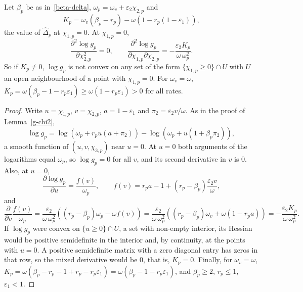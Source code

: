 \begin{proposition}\label{not-joint}
Let $\beta_p$ be as in~\eqref{beta-delta}, $\omega_p=\omega_v+\varepsilon_2\chi_{2,p}$ and
\begin{equation*}
K_p=\omega_v\left(\beta_p-r_p\right)-\omega\left(1-r_p(1-\varepsilon_1)\right),
\end{equation*}
the value of $\widehat\Delta_p$ at $\chi_{1,p}=0$. At $\chi_{1,p}=0$,
\begin{equation*}
\frac{\partial^2\log g_p}{\partial\chi_{2,p}^2}=0,\qquad
\frac{\partial^2\log g_p}{\partial\chi_{1,p}\partial\chi_{2,p}}=-\frac{\varepsilon_2K_p}{\omega\,\omega_p^2}.
\end{equation*}
So if $K_p\ne 0$, $\log g_p$ is not convex on any set of the form
$\{\chi_{1,p}\ge 0\}\cap U$ with $U$ an open neighbourhood of a point with
$\chi_{1,p}=0$. For $\omega_v=\omega$, $K_p=\omega\left(\beta_p-1-r_p\varepsilon_1\right)\ge\omega\left(1-r_p\varepsilon_1\right)>0$
for all rates.
\end{proposition}
\begin{proof}
Write $u=\chi_{1,p}$, $v=\chi_{2,p}$, $a=1-\varepsilon_1$ and
$\pi_2=\varepsilon_2v/\omega$. As in the proof of Lemma~\ref{g-chi2},
\begin{equation*}
\log g_p=\log\left(\omega_p+r_pu\left(a+\pi_2\right)\right)-\log\left(\omega_p+u\left(1+\beta_p\pi_2\right)\right),
\end{equation*}
a smooth function of $(u,v,\chi_{3,p})$ near $u=0$. At $u=0$ both arguments of
the logarithms equal $\omega_p$, so $\log g_p=0$ for all $v$, and its second
derivative in $v$ is $0$. Also, at $u=0$,
\begin{equation*}
\frac{\partial\log g_p}{\partial u}=\frac{f(v)}{\omega_p},\qquad
f(v)=r_pa-1+\left(r_p-\beta_p\right)\frac{\varepsilon_2v}{\omega},
\end{equation*}
and
\begin{equation*}
\frac{\partial}{\partial v}\frac{f(v)}{\omega_p}
=\frac{\varepsilon_2}{\omega\,\omega_p^2}\left(\left(r_p-\beta_p\right)\omega_p-\omega f(v)\right)
=\frac{\varepsilon_2}{\omega\,\omega_p^2}\left(\left(r_p-\beta_p\right)\omega_v+\omega\left(1-r_pa\right)\right)
=-\frac{\varepsilon_2K_p}{\omega\,\omega_p^2}.
\end{equation*}
If $\log g_p$ were convex on $\{u\ge 0\}\cap U$, a set with non-empty
interior, its Hessian would be positive semidefinite in the interior and, by
continuity, at the points with $u=0$. A positive semidefinite matrix with a
zero diagonal entry has zeros in that row, so the mixed derivative would be
$0$, that is, $K_p=0$. Finally, for $\omega_v=\omega$,
$K_p=\omega(\beta_p-r_p-1+r_p-r_p\varepsilon_1)=\omega(\beta_p-1-r_p\varepsilon_1)$,
and $\beta_p\ge 2$, $r_p\le 1$, $\varepsilon_1<1$.
\end{proof}

